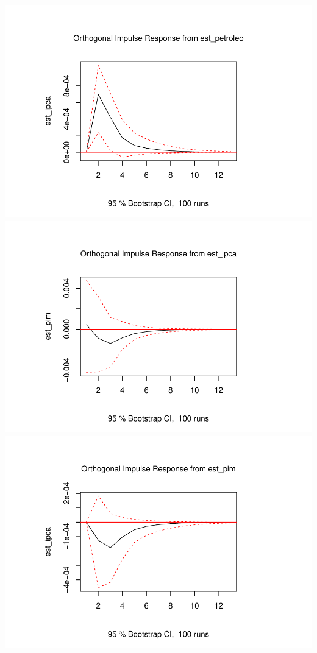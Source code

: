 \documentclass[12pt]{article}
\begin{document}
\includegraphics{teste_en_files/figure-latex/unnamed-chunk-14-4.pdf}
\includegraphics{teste_en_files/figure-latex/unnamed-chunk-14-5.pdf}
\includegraphics{teste_en_files/figure-latex/unnamed-chunk-14-6.pdf}
\end{document}
